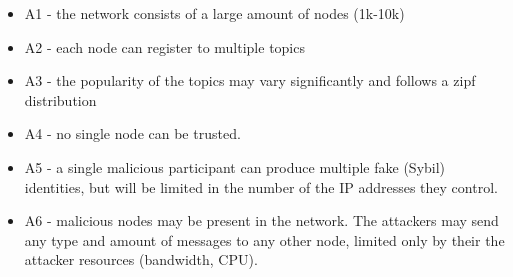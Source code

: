 \begin{itemize}
    \item A1 - the network consists of a large amount of nodes (1k-10k)
    \item A2 - each node can register to multiple topics
    \item A3 - the popularity of the topics may vary significantly and follows a zipf distribution 
    \item A4 - no single node can be trusted.
    \item A5 - a single malicious participant can produce multiple fake (Sybil) identities, but will be limited in the number of the IP addresses they control.
    \item A6 - malicious nodes may be present in the network. The attackers may send any type and amount of messages to any other node, limited only by their the attacker resources (bandwidth, CPU).
\end{itemize}

